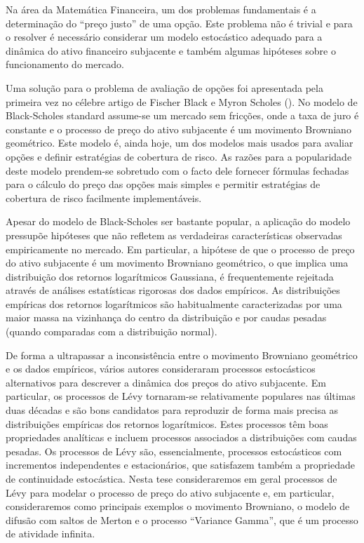 
    
\vspace{10em}


Na área da Matemática Financeira, um dos problemas fundamentais é a determinação do “preço justo” de uma opção. 
Este problema não é trivial e para o resolver é necessário considerar um modelo estocástico adequado para a dinâmica do ativo financeiro subjacente 
e também algumas hipóteses sobre o funcionamento do mercado. 

Uma solução para o problema de avaliação de opções foi apresentada pela primeira vez no célebre artigo de  Fischer Black e Myron Scholes (\cite{BS73}). 
No modelo de Black-Scholes standard assume-se um mercado sem fricções, onde a taxa de juro é constante e o processo de preço do ativo subjacente é um movimento Browniano geométrico. 
Este modelo é, ainda hoje, um dos modelos mais usados para avaliar opções e definir estratégias de cobertura de risco. 
As razões para a popularidade deste modelo prendem-se sobretudo com o facto dele fornecer fórmulas fechadas para o cálculo do preço das opções mais simples 
e permitir estratégias de cobertura de risco facilmente implementáveis. 

Apesar do modelo de Black-Scholes ser bastante popular, a aplicação do modelo pressupõe hipóteses que não refletem as verdadeiras características observadas empiricamente no mercado. 
Em particular, a hipótese de que o processo de preço do ativo subjacente é um movimento Browniano geométrico, o que implica uma distribuição dos retornos logarítmicos Gaussiana, 
é frequentemente rejeitada através de análises estatísticas rigorosas dos dados empíricos. 
As distribuições empíricas dos retornos logarítmicos são habitualmente caracterizadas por uma maior massa na vizinhança do centro da distribuição e por caudas pesadas 
(quando comparadas com a distribuição normal). 

De forma a ultrapassar a inconsistência entre o movimento Browniano geométrico e os dados empíricos, vários autores consideraram processos estocásticos alternativos 
para descrever a dinâmica dos preços do ativo subjacente. 
Em particular, os processos de Lévy tornaram-se relativamente populares nas últimas duas décadas e são bons candidatos para reproduzir de forma mais precisa as distribuições empíricas 
dos retornos logarítmicos. 
Estes processos têm boas propriedades analíticas e incluem processos associados a distribuições com caudas pesadas. 
Os processos de Lévy são, essencialmente, processos estocásticos com incrementos independentes e estacionários, que satisfazem também a propriedade de continuidade estocástica. 
Nesta tese consideraremos em geral processos de Lévy para modelar o processo de preço do ativo subjacente e, em particular, consideraremos como principais exemplos 
o movimento Browniano, o modelo de difusão com saltos de Merton e o processo “Variance Gamma”, que é um processo de atividade infinita.  

